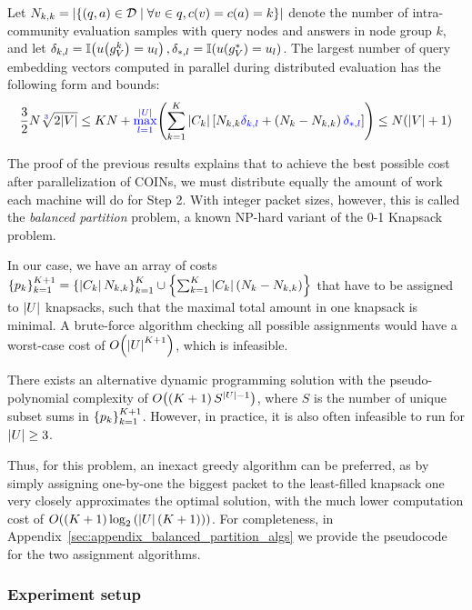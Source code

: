 \begin{proposition}
\label{proposition:complexity_distributed}
    Let $N_{k,k}=\mathopen{}\left|\mathopen{}\left\{\mathopen{}\left(q, a\right) \in \mathcal{D} \mid \forall v \in q, c\mathopen{}\left(v\right)=c\mathopen{}\left(a\right)=k\right\}\right|$ denote the number of intra-community evaluation samples with query nodes and answers in node group $k$, and let $\delta_{k,l}=\mathbb{I}\mathopen{}\left(u\mathopen{}\left(g_V^k\right)=u_l\right),\delta_{*,l}=\mathbb{I}\mathopen{}\left(u\mathopen{}\left(g_V^*\right)=u_l\right)$. The largest number of query embedding vectors computed in parallel during distributed evaluation has the following form and bounds:
\begin{equation}
\label{eq:complexity_and_bounds_distributed}
\frac{3}{2} N \sqrt[\textcolor{blue}{3}]{2\mathopen{}\left|V\right|} \leq KN+\textcolor{blue}{\max_{l=1}^{\mathopen{}\left|U\right|}}{\mathopen{}\left(\sum_{k=1}^{K}{\mathopen{}\left|C_k\right|\mathopen{}\left[N_{k,k}\textcolor{blue}{\delta_{k,l}} + \mathopen{}\left(N_k-N_{k,k}\right)\textcolor{blue}{\delta_{*,l}}\right]}\right)} \leq N \mathopen{}\left(\mathopen{}\left|V\right| + 1\right) 
\end{equation}
\end{proposition}
The proof of the previous results explains that to achieve the best possible cost after parallelization of COINs, we must distribute equally the amount of work each machine will do for Step 2. With integer packet sizes, however, this is called the \emph{balanced partition} problem, a known NP-hard variant of the 0-1 Knapsack problem. 

In our case, we have an array of costs $\mathopen{}\left\{p_k\right\}_{k=1}^{K+1}=\mathopen{}\left\{\mathopen{}\left|C_k\right|N_{k,k}\right\}_{k=1}^{K}\cup\mathopen{}\left\{\sum_{k=1}^{K}{\mathopen{}\left|C_k\right|\mathopen{}\left(N_{k}-N_{k,k}\right)}\right\}$ that have to be assigned to $\mathopen{}\left|U\right|$ knapsacks, such that the maximal total amount in one knapsack is minimal. A brute-force algorithm checking all possible assignments would have a worst-case cost of $O\mathopen{}\left(\mathopen{}\left|U\right|^{K+1}\right)$, which is infeasible. 

There exists an alternative dynamic programming solution with the pseudo-polynomial complexity of $O\mathopen{}\left(\mathopen{}\left(K+1\right)S^{\mathopen{}\left|U\right|-1}\right)$, where $S$ is the number of unique subset sums in $\mathopen{}\left\{p_k\right\}_{k=1}^{K+1}$. However, in practice, it is also often infeasible to run for $\mathopen{}\left|U\right|\geq 3$. 

Thus, for this problem, an inexact greedy algorithm can be preferred, as by simply assigning one-by-one the biggest packet to the least-filled knapsack one very closely approximates the optimal solution, with the much lower computation cost of $O\mathopen{}\left(\mathopen{}\left(K+1\right)\log_2{\mathopen{}\left(\mathopen{}\left|U\right|\mathopen{}\left(K+1\right)\right)}\right)$. For completeness, in Appendix~\ref{sec:appendix_balanced_partition_algs} we provide the pseudocode for the two assignment algorithms.
\subsubsection{Experiment setup}
